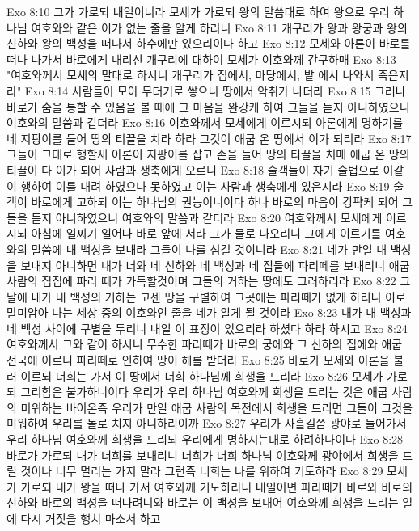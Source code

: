 Exo 8:10  그가 가로되 내일이니라 모세가 가로되 왕의 말씀대로 하여 왕으로 우리 하나님 여호와와 같은 이가 없는 줄을 알게 하리니
Exo 8:11  개구리가 왕과 왕궁과 왕의 신하와 왕의 백성을 떠나서 하수에만 있으리이다 하고
Exo 8:12  모세와 아론이 바로를 떠나 나가서 바로에게 내리신 개구리에 대하여 모세가 여호와께 간구하매
Exo 8:13  "여호와께서 모세의 말대로 하시니 개구리가 집에서, 마당에서, 밭 에서 나와서 죽은지라"
Exo 8:14  사람들이 모아 무더기로 쌓으니 땅에서 악취가 나더라
Exo 8:15  그러나 바로가 숨을 통할 수 있음을 볼 때에 그 마음을 완강케 하여 그들을 듣지 아니하였으니 여호와의 말씀과 같더라
Exo 8:16  여호와께서 모세에게 이르시되 아론에게 명하기를 네 지팡이를 들어 땅의 티끌을 치라 하라 그것이 애굽 온 땅에서 이가 되리라
Exo 8:17  그들이 그대로 행할새 아론이 지팡이를 잡고 손을 들어 땅의 티끌을 치매 애굽 온 땅의 티끌이 다 이가 되어 사람과 생축에게 오르니
Exo 8:18  술객들이 자기 술법으로 이같이 행하여 이를 내려 하였으나 못하였고 이는 사람과 생축에게 있은지라
Exo 8:19  술객이 바로에게 고하되 이는 하나님의 권능이니이다 하나 바로의 마음이 강퍅케 되어 그들을 듣지 아니하였으니 여호와의 말씀과 같더라
Exo 8:20  여호와께서 모세에게 이르시되 아침에 일찌기 일어나 바로 앞에 서라 그가 물로 나오리니 그에게 이르기를 여호와의 말씀에 내 백성을 보내라 그들이 나를 섬길 것이니라
Exo 8:21  네가 만일 내 백성을 보내지 아니하면 내가 너와 네 신하와 네 백성과 네 집들에 파리떼를 보내리니 애굽 사람의 집집에 파리 떼가 가득할것이며 그들의 거하는 땅에도 그러하리라
Exo 8:22  그 날에 내가 내 백성의 거하는 고센 땅을 구별하여 그곳에는 파리떼가 없게 하리니 이로 말미암아 나는 세상 중의 여호와인 줄을 네가 알게 될 것이라
Exo 8:23  내가 내 백성과 네 백성 사이에 구별을 두리니 내일 이 표징이 있으리라 하셨다 하라 하시고
Exo 8:24  여호와께서 그와 같이 하시니 무수한 파리떼가 바로의 궁에와 그 신하의 집에와 애굽 전국에 이르니 파리떼로 인하여 땅이 해를 받더라
Exo 8:25  바로가 모세와 아론을 불러 이르되 너희는 가서 이 땅에서 너희 하나님께 희생을 드리라
Exo 8:26  모세가 가로되 그리함은 불가하니이다 우리가 우리 하나님 여호와께 희생을 드리는 것은 애굽 사람의 미워하는 바이온즉 우리가 만일 애굽 사람의 목전에서 희생을 드리면 그들이 그것을 미워하여 우리를 돌로 치지 아니하리이까
Exo 8:27  우리가 사흘길쯤 광야로 들어가서 우리 하나님 여호와께 희생을 드리되 우리에게 명하시는대로 하려하나이다
Exo 8:28  바로가 가로되 내가 너희를 보내리니 너희가 너희 하나님 여호와께 광야에서 희생을 드릴 것이나 너무 멀리는 가지 말라 그런즉 너희는 나를 위하여 기도하라
Exo 8:29  모세가 가로되 내가 왕을 떠나 가서 여호와께 기도하리니 내일이면 파리떼가 바로와 바로의 신하와 바로의 백성을 떠나려니와 바로는 이 백성을 보내어 여호와께 희생을 드리는 일에 다시 거짓을 행치 마소서 하고
